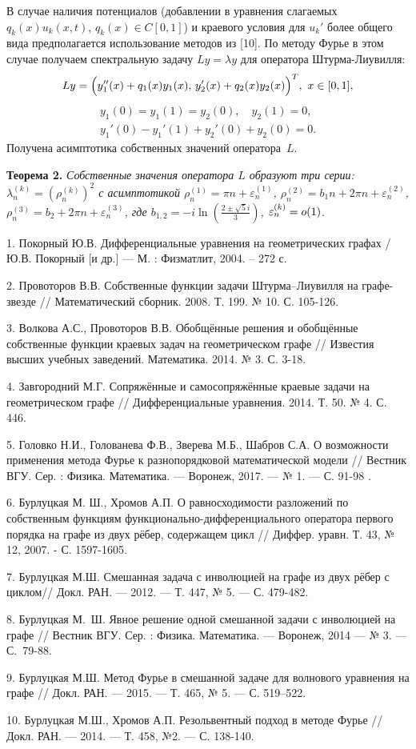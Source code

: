 В случае наличия потенциалов (добавлении в уравнения  слагаемых
$q_k(x)u_k(x,t)$, $q_k(x)\in C[0,1]$) и краевого условия для $u_k'$
более общего вида предполагается использование методов из [10]. По
методу Фурье в этом случае получаем спектральную задачу $Ly=\lambda
y$ для оператора Штурма-Лиувилля:
$$
    Ly=\Bigl(y_1''(x) + q_1(x) y_1(x), \,
    y_2'(x) +  q_2(x) y_2(x)\Bigl)^T,\   x\in [0,1], $$
    $$\begin{array}{c}
    y_1(0)=y_1(1)=y_2(0), \quad
    y_2(1)=0, \\
    y_1'(0) - y_1'(1) + y_2'(0) + y_2(0)=0.
    \end{array}
    $$
Получена асимптотика собственных значений   оператора~$L$.

    \textbf{Теорема 2.}
\textit{Собственные значения оператора $L$ образуют три серии:
$\lambda _n^{(k)}=(\rho_n^{(k)})^2$ с асимптотикой $\rho_n^{(1)}=\pi
n + \varepsilon_n^{(1)}$, $\rho_n^{(2)}=b_1 n + 2\pi n +
\varepsilon_n^{(2)}$, $\rho_n^{(3)}=b_2 + 2\pi n +
\varepsilon_n^{(3)}$,
    где $b _{1,2}=-i \ln(\frac{2\pm\sqrt{5}i}{3})$, $\varepsilon_n^{(k)}=\tiny{o}(1)$.} \\


    \nopagebreak

1.  Покорный Ю.В. Дифференциальные уравнения на геометрических
графах / Ю.В. Покорный [и др.] --- М. : Физматлит, 2004. -- 272 с.

2.  Провоторов В.В. Собственные функции задачи Штурма–Лиувилля на
графе-звезде // Математический сборник. 2008. Т. 199. № 10. С.
105-126.

3.  Волкова А.С., Провоторов В.В. Обобщённые решения и обобщённые
собственные функции краевых задач на геометрическом графе  //
Известия высших учебных заведений. Математика. 2014. № 3. С. 3-18.

4. Завгородний М.Г. Сопряжённые и самосопряжённые краевые задачи на
геометрическом графе   //
 Дифференциальные уравнения. 2014. Т. 50. № 4. С.
446.

5. Головко Н.И., Голованева Ф.В., Зверева М.Б., Шабров С.А. О
возможности применения метода Фурье к разнопорядковой математической
модели // Вестник ВГУ. Сер. :  Физика. Математика. --- Воронеж,
2017. --- № 1. --- С. 91-98 .

6.  Бурлуцкая М. Ш., Хромов  А.П.  О равносходимости разложений по
собственным функциям функционально-диф\-фе\-рен\-циаль\-ного
оператора первого порядка на  графе из двух рёбер,  содержащем  цикл
// Диффер. уравн. Т. 43, №  12,  2007. - С. 1597-1605.

7. Бурлуцкая М.Ш. Смешанная задача с инволюцией на графе  из двух
рёбер с циклом// Докл. РАН. --- 2012. --- Т. 447, № 5. --- С.
479-482.

8. Бурлуцкая М.~Ш.  Явное решение одной смешанной задачи с
 инволюцией на графе  // Вестник ВГУ.  Сер. : Физика. Математика. --- Воронеж, 2014 ---  № 3.
    --- С.~79-88.

9.  Бурлуцкая М.Ш. Метод Фурье в смешанной задаче для волнового
уравнения на графе   // Докл. РАН. --- 2015. --- Т. 465, № 5. --- С.
519–522.

10.  Бурлуцкая М.Ш., Хромов А.П. Резольвентный подход в методе Фурье
  // Докл. РАН. --– 2014. --- Т. 458, №2.
--- С. 138-140.
